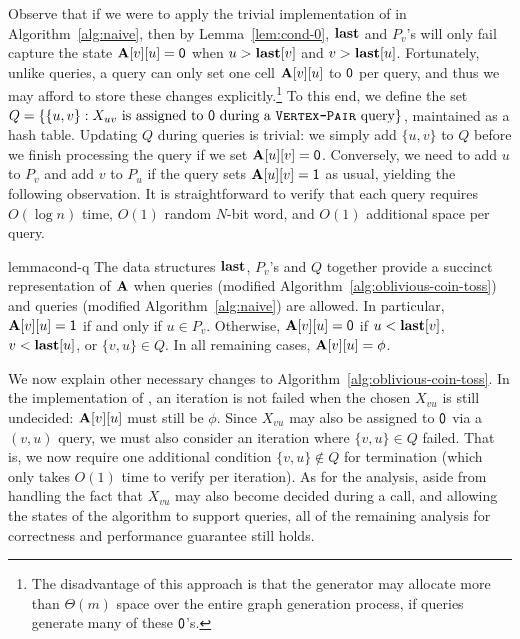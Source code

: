 Observe that if we were to apply the trivial implementation of  in Algorithm~\ref{alg:naive}, then by Lemma~\ref{lem:cond-0}, $\mathbf{last}$ and $P_v$'s will only fail capture the state $\mathbf{A}[v][u] = \mathsf{0}$ when $u > \mathbf{last}[v]$ and $v > \mathbf{last}[u]$. Fortunately, unlike  queries, a  query can only set one cell $\mathbf{A}[v][u]$ to $\mathsf{0}$ per query, and thus we may afford to store these changes explicitly.\footnote{The disadvantage of this approach is that the generator may allocate more than $\Theta(m)$ space over the entire graph generation process, if  queries generate many of these $\mathsf{0}$'s.} To this end, we define the set $Q = \{\{u,v\}: X_{uv}\textrm{ is assigned to }\mathsf{0} \textrm{ during a \texttt{\textsc{Vertex-Pair}} query}\}$, maintained as a hash table. Updating $Q$ during  queries is trivial: we simply add $\{u,v\}$ to $Q$ before we finish processing the query if we set $\mathbf{A}[u][v]=\mathsf{0}$. Conversely, we need to add $u$ to $P_v$ and add $v$ to $P_u$ if the  query sets $\mathbf{A}[u][v]=\mathsf{1}$ as usual, yielding the following observation. It is straightforward to verify that each  query requires $O(\log n)$ time, $O(1)$ random $N$-bit word, and $O(1)$ additional space per query.

\begin{restatable}{lemma}{cond-q}\label{lem:cond-0-q}
The data structures $\mathbf{last}$, $P_v$'s and $Q$ together provide a succinct representation of $\mathbf{A}$ when  queries (modified Algorithm~\ref{alg:oblivious-coin-toss}) and  queries (modified Algorithm~\ref{alg:naive}) are allowed. In particular, $\mathbf{A}[v][u]=\mathsf{1}$ if and only if $u \in P_v$. Otherwise, $\mathbf{A}[v][u]=\mathsf{0}$ if $u <\mathbf{last}[v]$, $v < \mathbf{last}[u]$, or $\{v,u\} \in Q$. In all remaining cases, $\mathbf{A}[v][u]=\phi$.
\end{restatable}

We now explain other necessary changes to Algorithm~\ref{alg:oblivious-coin-toss}. In the implementation of , an iteration is not failed when the chosen $X_{vu}$ is still undecided: $\mathbf{A}[v][u]$ must still be $\phi$. Since $X_{vu}$ may also be assigned to $\mathsf{0}$ via a $(v,u)$ query, we must also consider an iteration where $\{v,u\} \in Q$ failed. That is, we now require one additional condition $\{v,u\} \notin Q$ for termination (which only takes $O(1)$ time to verify per iteration). As for the analysis, aside from handling the fact that $X_{vu}$ may also become decided during a  call, and allowing the states of the algorithm to support  queries, all of the remaining analysis for correctness and performance guarantee still holds. 


